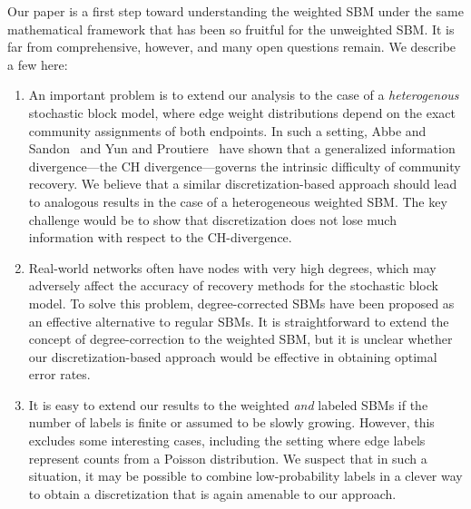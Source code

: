 \documentclass{article}
\begin{document}
Our paper is a first step toward understanding the weighted SBM under the same mathematical framework that has been so fruitful for the unweighted SBM. It is far from comprehensive, however, and many open questions remain. We describe a few here:
\begin{enumerate}
\item An important problem is to extend our analysis to the case of a \emph{heterogenous} stochastic block model, where edge weight distributions depend on the exact community assignments of both endpoints. In such a setting, Abbe and Sandon~\cite{AbbSan15} and Yun and Proutiere~\cite{yun2016optimal} have shown that a generalized information divergence---the CH divergence---governs the intrinsic difficulty of community recovery. We believe that a similar discretization-based approach should lead to analogous results in the case of a heterogeneous weighted SBM. The key challenge would be to show that discretization does not lose much information with respect to the CH-divergence.
\item Real-world networks often have nodes with very high degrees, which may adversely affect the accuracy of recovery methods for the stochastic block model. To solve this problem, degree-corrected SBMs \cite{zhao2012consistency, gao2016community} have been proposed as an effective alternative to regular SBMs. It is straightforward to extend the concept of degree-correction to the weighted SBM, but it is unclear whether our discretization-based approach would be effective in obtaining optimal error rates.
\item It is easy to extend our results to the weighted \emph{and} labeled SBMs if the number of labels is finite or assumed to be slowly growing. However, this excludes some interesting cases, including the setting where edge labels represent counts  from a Poisson distribution. We suspect that in such a situation, it may be possible to combine low-probability labels in a clever way to obtain a discretization that is again amenable to our approach. 
\end{enumerate}




\newpage




\appendix
\end{document}
